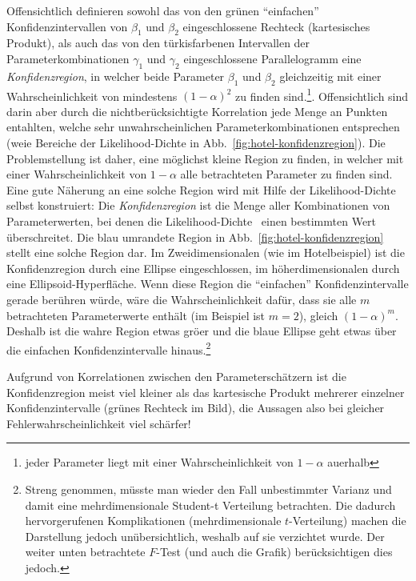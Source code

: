 Offensichtlich definieren sowohl das von den gr\"unen ``einfachen''
Konfidenzintervallen von $\beta_1$ und $\beta_2$
 eingeschlossene Rechteck (kartesisches Produkt), als auch das von den
t\"urkisfarbenen Intervallen der Parameterkombinationen $\gamma_1$ und
$\gamma_2$ eingeschlossene Parallelogramm eine \emph{Konfidenzregion}, in
welcher beide Parameter $\beta_1$ und $\beta_2$ gleichzeitig mit einer
Wahrscheinlichkeit von mindestens $(1-\alpha)^2$ zu finden sind.\footnote{jeder
Parameter liegt mit einer Wahrscheinlichkeit von $1-\alpha$
au\3erhalb}. Offensichtlich sind darin aber durch die nichtber\"ucksichtigte
Korrelation jede Menge an Punkten entahlten, welche sehr
unwahrscheinlichen Parameterkombinationen entsprechen (wei\3e Bereiche
der Likelihood-Dichte in Abb.~\ref{fig:hotel-konfidenzregion}). Die
Problemstellung ist daher, eine m\"oglichst kleine Region zu finden,
in welcher mit einer Wahrscheinlichkeit von 
$1-\alpha$ alle betrachteten Parameter zu finden sind. Eine gute N\"aherung an
eine solche Region wird mit Hilfe der
Likelihood-Dichte~  selbst konstruiert:
Die
\emph{Konfidenzregion} ist die Menge aller Kombinationen von 
Parameterwerten, bei denen die
Likelihood-Dichte~ einen bestimmten Wert
\"uberschreitet. Die  blau umrandete Region in
Abb.~\ref{fig:hotel-konfidenzregion} stellt eine solche Region dar. 
Im Zweidimensionalen (wie im
Hotelbeispiel) ist die
Konfidenzregion durch eine Ellipse eingeschlossen, im
h\"oherdimensionalen durch eine Ellipsoid-Hyperfl\"ache.
Wenn diese Region die ``einfachen'' Konfidenzintervalle gerade
ber\"uhren w\"urde, w\"are die Wahrscheinlichkeit daf\"ur, dass sie
alle $m$ betrachteten Parameterwerte enth\"alt (im Beispiel ist
$m=2$), gleich $(1-\alpha)^m$. Deshalb ist die wahre Region etwas
gr\"o\3er und die blaue Ellipse geht etwas \"uber die einfachen
Konfidenzintervalle hinaus.\footnote{Streng genommen,
m\"usste man wieder den Fall unbestimmter Varianz und damit eine
mehrdimensionale Student-t Verteilung betrachten. Die dadurch
hervorgerufenen Komplikationen (mehrdimensionale $t$-Verteilung)
machen die Darstellung jedoch un\"ubersichtlich, weshalb auf sie
verzichtet wurde. Der weiter unten betrachtete
$F$-Test (und auch die Grafik) ber\"ucksichtigen dies jedoch.}

Aufgrund von Korrelationen zwischen den Parametersch\"atzern 
ist die Konfidenzregion meist viel kleiner
als das kartesische Produkt mehrerer einzelner Konfidenzintervalle
(gr\"unes Rechteck im Bild), die Aussagen also bei gleicher
Fehlerwahrscheinlichkeit viel sch\"arfer!

